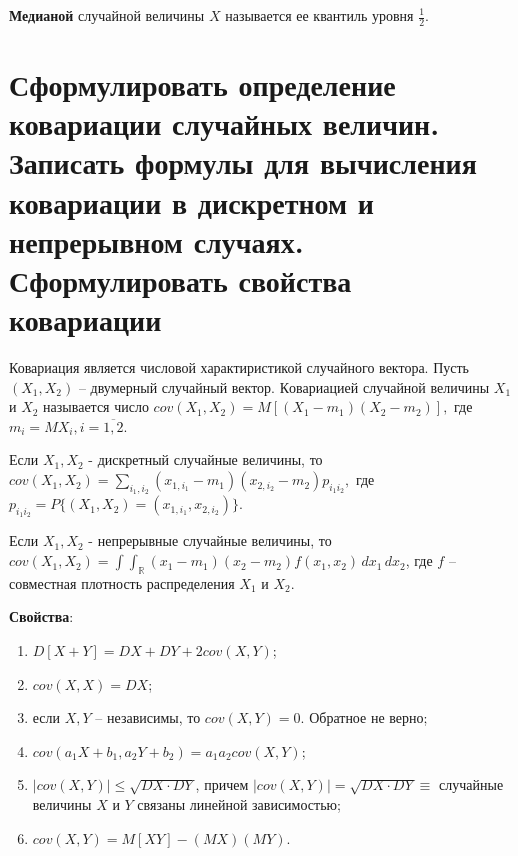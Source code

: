 \textbf{Медианой} случайной величины $X$ называется ее квантиль уровня $\frac{1}{2}$.

\section{Сформулировать определение ковариации случайных величин. Записать формулы для вычисления ковариации в дискретном и непрерывном случаях. Сформулировать свойства ковариации}

Ковариация является числовой характиристикой случайного вектора. Пусть $(X_1, X_2)$ -- двумерный случайный вектор. $Ковариацией$ случайной величины $X_1$ и $X_2$ называется число $cov(X_1, X_2) = M[(X_1 - m_1)(X_2 - m_2)],$ где $m_i = MX_i, i = \overline{1, 2}$.

Если $X_1, X_2$ - дискретный случайные величины, то $cov(X_1, X_2) = \sum_{i_1, i_2}(x_{1, i_1}-m_1)(x_{2, i_2}-m_2)p_{i_1i_2},$ где $p_{i_1i_2} = P\{(X_1, X_2) = (x_{1, i_1}, x_{2, i_2})\}$.

Если $X_1, X_2$ - непрерывные случайные величины, то $cov(X_1, X_2) = \int \int_{\mathbb{R}} (x_1 - m_1)(x_2 - m_2) f(x_1, x_2) \, dx_1 \,dx_2$, где $f$ -- совместная плотность распределения $X_1$ и $X_2$.

\textbf{Свойства}:
\begin{enumerate}
	\item $D[X+Y] = DX + DY + 2cov(X, Y)$;
	\item $cov(X, X) = DX$;
	\item если $X, Y$ -- независимы, то $cov(X, Y) = 0.$ Обратное не верно;
	\item $cov(a_1X + b_1, a_2Y + b_2) = a_1a_2cov(X, Y)$;
	\item $|cov(X, Y)| \leq \sqrt{DX \cdot DY}$, причем $|cov(X, Y)| = \sqrt{DX \cdot DY} \equiv$ случайные величины $X$ и $Y$ связаны линейной зависимостью;
	\item $cov(X, Y) = M[XY] - (MX)(MY)$.
\end{enumerate}